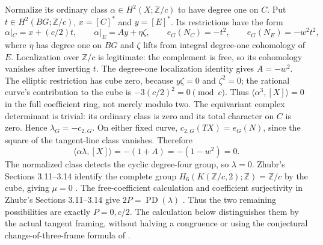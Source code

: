 Normalize its ordinary class $\alpha\in H^2(X;\mathbb Z/c)$
to have degree one on $C$. Put $t\in H^2(BG;\mathbb Z/c)$,
$x=[C]^*$ and $y=[E]^*$. Its restrictions have the form
\[
 \alpha|_C=x+(c/2)t,\qquad
 \alpha|_E=A y+\eta\zeta,\qquad
 e_G(N_C)=-t^2,\qquad e_G(N_E)=-w^2t^2,                       \tag{D44.0a}
\]
where $\eta$ has degree one on $BG$ and $\zeta$ lifts from
integral degree-one cohomology of $E$. Localization over
$\mathbb Z/c$ is legitimate: the complement is free, so its
cohomology vanishes after inverting $t$. The degree-one
localization identity gives $A=-w^2$. The elliptic restriction
has cube zero, because $y\zeta=0$ and $\zeta^2=0$; the rational
curve's contribution to the cube is $-3(c/2)^2=0\pmod c$.
Thus $\langle\alpha^3,[X]\rangle=0$ in the full coefficient
ring, not merely modulo two.
The equivariant complex determinant is trivial: its ordinary
class is zero and its total character on $C$ is zero.
Hence $\lambda_G=-c_{2,G}$. On either fixed curve,
$c_{2,G}(TX)=e_G(N)$, since the square of the tangent-line
class vanishes. Therefore
\[
 \langle\alpha\lambda,[X]\rangle=-(1+A)=-(1-w^2)=0.           \tag{D44.0b}
\]
The normalized class detects the cyclic degree-four group, so
$\lambda=0$. Zhubr's Sections 3.11--3.14 identify the complete
group $H_6(K(\mathbb Z/c,2);\mathbb Z)=\mathbb Z/c$ by the cube,
giving $\mu=0$ \cite[Sections 3.11--3.14]{manZhubr75}.
The free-coefficient calculation
and coefficient surjectivity in Zhubr's Sections 3.11--3.14 give
$2P=\operatorname{PD}(\lambda)$
\cite[Theorem 5 and Sections 3.11--3.14]{manZhubr75}.
Thus the two remaining possibilities
are exactly $P=0,c/2$. The calculation below distinguishes them by
the actual tangent framing, without halving a congruence or using
the conjectural change-of-three-frame formula of \cite{ffZhubr13}.

